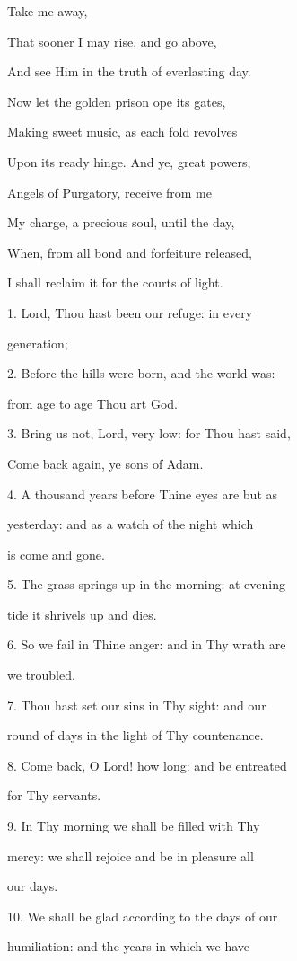 Take me away,

That sooner I may rise, and go above,

And see Him in the truth of everlasting day.


Now let the golden prison ope its gates,

Making sweet music, as each fold revolves

Upon its ready hinge. And ye, great powers,

Angels of Purgatory, receive from me

My charge, a precious soul, until the day,

When, from all bond and forfeiture released,

I shall reclaim it for the courts of light.


1. Lord, Thou hast been our refuge: in every

generation;

2. Before the hills were born, and the world was:

from age to age Thou art
God.

3. Bring us not, Lord, very low: for Thou hast said,

Come back again, ye sons
of Adam.

4. A thousand years before Thine eyes are but as

yesterday: and as a watch
of the night which

is come and gone.

5. The grass springs up in the morning: at evening

tide it shrivels up and
dies.

6. So we fail in Thine anger: and in Thy wrath are

we troubled.

7. Thou hast set our sins in Thy sight: and our

round of days in the
light of Thy countenance.

8. Come back, O Lord! how long: and be entreated

for Thy servants.

9. In Thy morning we shall be filled with Thy

mercy: we shall rejoice
and be in pleasure all

our days. 

10. We shall be glad according to the days of our

humiliation: and the
years in which we have


